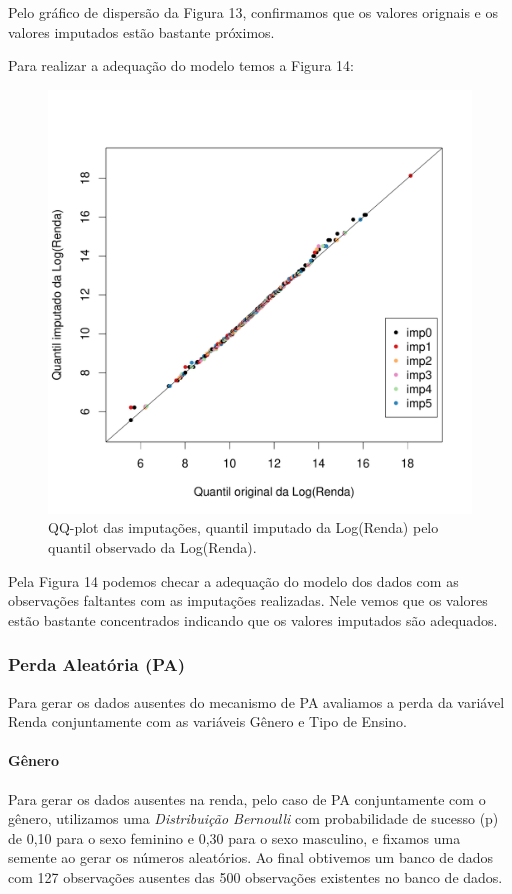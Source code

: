 \documentclass[]{article}
\let\oldparagraph\paragraph
\renewcommand{\paragraph}[1]{\oldparagraph{#1}\mbox{}}
\begin{document}
Pelo gráfico de dispersão da Figura 13, confirmamos que os valores
orignais e os valores imputados estão bastante próximos.

Para realizar a adequação do modelo temos a Figura 14:

\begin{figure}[H]

{\centering \includegraphics[width=0.6\linewidth]{p43-graf} 

}

\caption{QQ-plot das imputações, quantil imputado da Log(Renda) pelo quantil observado da Log(Renda).}\label{fig:unnamed-chunk-22}
\end{figure}

Pela Figura 14 podemos checar a adequação do modelo dos dados com as
observações faltantes com as imputações realizadas. Nele vemos que os
valores estão bastante concentrados indicando que os valores imputados
são adequados.

\subsubsection{Perda Aleatória (PA)}\label{perda-aleatoria-pa}

Para gerar os dados ausentes do mecanismo de PA avaliamos a perda da
variável Renda conjuntamente com as variáveis Gênero e Tipo de Ensino.

\paragraph{Gênero}\label{genero}

Para gerar os dados ausentes na renda, pelo caso de PA conjuntamente com
o gênero, utilizamos uma \emph{Distribuição Bernoulli} com probabilidade
de sucesso (p) de 0,10 para o sexo feminino e 0,30 para o sexo
masculino, e fixamos uma semente ao gerar os números aleatórios. Ao
final obtivemos um banco de dados com 127 observações ausentes das 500
observações existentes no banco de dados.
\end{document}
